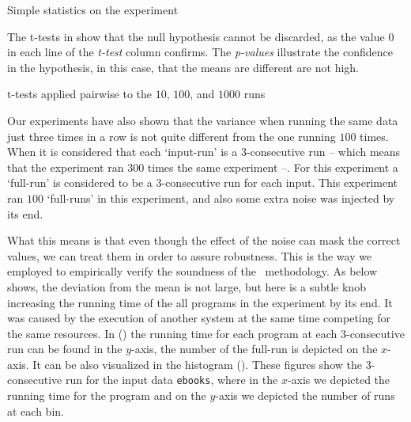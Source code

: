 \begin{table}
  \centering
  \begin{tiny}
  
  \end{tiny}
  \caption{Simple statistics on the experiment}
  \label{tab:robustTest}
\end{table}

The t-tests in  show that the null hypothesis cannot be discarded, as the value $0$ in each line of the \emph{t-test} column confirms. The \emph{p-values} illustrate the confidence in the hypothesis, in this case, that the means are different are not high.

\begin{table}
  \centering
  \begin{tiny}
  
  \end{tiny}
  \caption{t-tests applied pairwise to the $10$, $100$, and $1000$ runs}
  \label{tab:ttest}
\end{table}

Our experiments have also shown that the variance when running the same data just three times in a row is not quite different from the one running $100$ times. When it is considered that each `input-run' is a $3$-consecutive run -- which means that the experiment ran $300$ times the same experiment --. For this experiment a `full-run' is considered to be a $3$-consecutive run for each input. This experiment ran $100$ `full-runs' in this experiment, and also some extra noise was injected by its end.

What this means is that even though the effect of the noise can mask the correct values, we can treat them in order to assure robustness. This is the way we employed to empirically verify the soundness of the \CP\ methodology. As  below shows, the deviation from the mean is not large, but here is a subtle knob increasing the running time of the all programs in the experiment by its end. It was caused by the execution of another system at the same time competing for the same resources. In () the running time for each program at each 3-consecutive run can be found in the $y$-axis, the number of the full-run is depicted on the $x$-axis. It can be also visualized in the histogram (). These figures show the $3$-consecutive run for the input data {\tt ebooks}, where in the $x$-axis we depicted the running time for the program and on the $y$-axis we depicted the number of runs at each bin.

